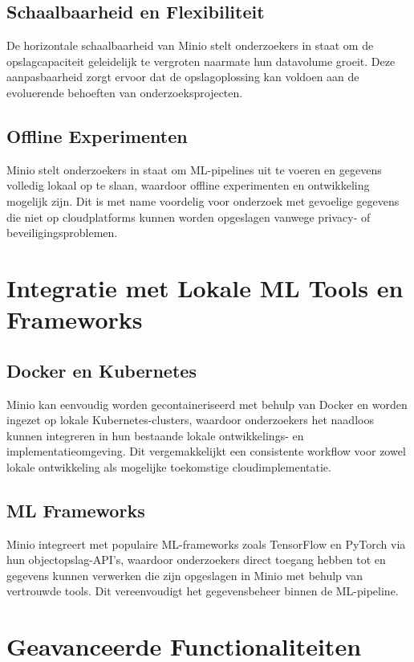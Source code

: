 \subsection{Schaalbaarheid en Flexibiliteit}
De horizontale schaalbaarheid van Minio stelt onderzoekers in staat om de opslagcapaciteit geleidelijk te vergroten naarmate hun datavolume groeit. Deze aanpasbaarheid zorgt ervoor dat de opslagoplossing kan voldoen aan de evoluerende behoeften van onderzoeksprojecten.

\subsection{Offline Experimenten}
Minio stelt onderzoekers in staat om ML-pipelines uit te voeren en gegevens volledig lokaal op te slaan, waardoor offline experimenten en ontwikkeling mogelijk zijn. Dit is met name voordelig voor onderzoek met gevoelige gegevens die niet op cloudplatforms kunnen worden opgeslagen vanwege privacy- of beveiligingsproblemen.

\section{Integratie met Lokale ML Tools en Frameworks}

\subsection{Docker en Kubernetes}
Minio kan eenvoudig worden gecontaineriseerd met behulp van Docker en worden ingezet op lokale Kubernetes-clusters, waardoor onderzoekers het naadloos kunnen integreren in hun bestaande lokale ontwikkelings- en implementatieomgeving. Dit vergemakkelijkt een consistente workflow voor zowel lokale ontwikkeling als mogelijke toekomstige cloudimplementatie.

\subsection{ML Frameworks}
Minio integreert met populaire ML-frameworks zoals TensorFlow en PyTorch via hun objectopslag-API's, waardoor onderzoekers direct toegang hebben tot en gegevens kunnen verwerken die zijn opgeslagen in Minio met behulp van vertrouwde tools. Dit vereenvoudigt het gegevensbeheer binnen de ML-pipeline.

\section{Geavanceerde Functionaliteiten}

